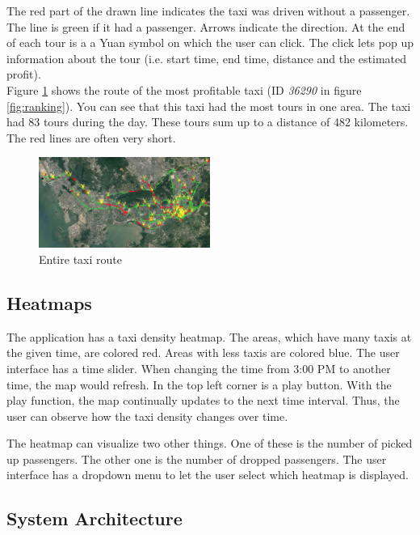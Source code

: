 \documentclass[10pt]{sig-alternate}
\begin{document}
The red part of the drawn line indicates the taxi was driven without a passenger. The line is green if it had a passenger. Arrows indicate the direction. At the end of each tour is a a Yuan symbol on which the user can click. The click lets pop up information about the tour (i.e. start time, end time, distance and the estimated profit).\\

Figure \ref{fig:best_taxi} shows the route of the most profitable taxi (ID \textit{36290} in figure \ref{fig:ranking}). You can see that this taxi had the most tours in one area. The taxi had 83 tours during the day. These tours sum up to a distance of 482 kilometers. The red lines are often very short.

\begin{figure}[ht]
\centering
\includegraphics[width=0.5\textwidth]{img/best_taxi.png}
\caption{Entire taxi route}
\label{fig:best_taxi}
\end{figure}

\subsection{Heatmaps}
\label{sec:heatmaps}

The application has a taxi density heatmap. The areas, which have many taxis at the given time, are colored red. Areas with less taxis are colored blue. The user interface has a time slider. When changing the time from 3:00 PM to another time, the map would refresh. In the top left corner is a play button. With the play function, the map continually updates to the next time interval. Thus, the user can observe how the taxi density changes over time.

The heatmap can visualize two other things. One of these is the number of picked up passengers. The other one is the number of dropped passengers. The user interface has a dropdown menu to let the user select which heatmap is displayed.

\subsection{System Architecture}
\end{document}
